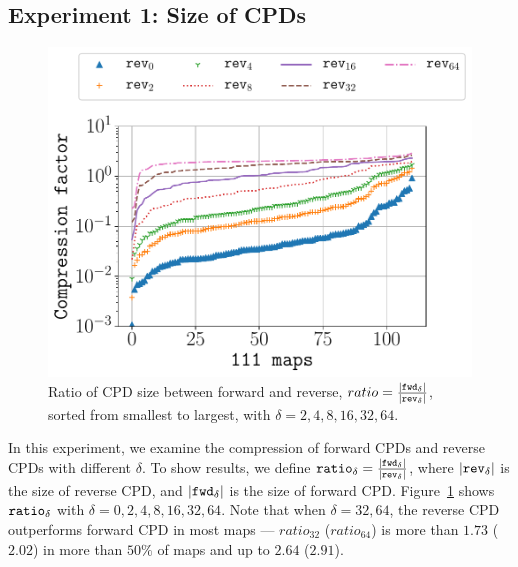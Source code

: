 \subsection{Experiment 1: Size of CPDs}

\begin{figure}
    \centering
    \includegraphics[width=\columnwidth]{pic/fwd-bwd.pdf}
    \caption{
    Ratio of CPD size between forward and reverse, $ratio=\frac{|\tt fwd_\delta|}{|\tt rev_\delta|}$,
    sorted from smallest to largest, with $\delta = 2,4,8,16,32,64$.}
    \label{fig:fwd-bwd}
\end{figure}

%

In this experiment, we examine the compression of forward CPDs and reverse
CPDs with different $\delta$.
To show results, we define $\tt ratio_{\delta}=\frac{|\tt fwd_{\delta}|}{|\tt
rev_{\delta}|}$, where $|\tt rev_{\delta}|$ is the size of reverse CPD,
and $|\tt fwd_{\delta}|$ is the size of forward CPD.
Figure~\ref{fig:fwd-bwd} shows $\tt ratio_{\delta}$ with $\delta =
0,2,4,8,16,32,64$.
Note that when $\delta=32,64$, the reverse CPD outperforms forward CPD in
most maps --- $ratio_{32}$ ($ratio_{64}$) is more than $1.73$ ($2.02$)
in more than $50\%$ of maps and up to $2.64$ ($2.91$).


